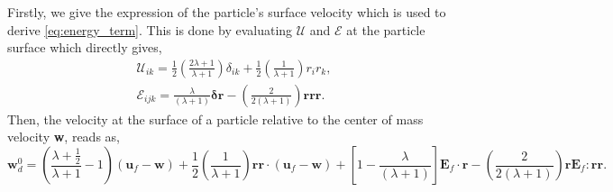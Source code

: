 Firstly, we give the expression of the particle's surface velocity which is used to derive \ref{eq:energy_term}. 
This is done by evaluating $\mathcal{U}$ and $\mathcal{E}$ at the particle surface which directly gives, 
\begin{align}
    \mathcal{U}_{ik} = 
    \frac{1}{2}\left(\frac{2\lambda + 1}{\lambda +1}\right)
    \delta_{ik} 
    + 
    \frac{1}{2}\left(\frac{1}{\lambda +1}\right)
    r_ir_k,  \\
    \mathcal{E}_{ijk}
    = 
    \frac{\lambda}{(\lambda + 1)}
    \bm\delta\textbf{r}
    -\left(\frac{2}{2(\lambda +1 )} \right) \textbf{rrr}. 
\end{align}
Then, the velocity at the surface of a particle relative to the center of mass velocity \textbf{w}, reads as, 
\begin{equation*}
    \textbf{w}_d^0 
    = \left(\frac{\lambda + \frac{1}{2}}{\lambda +1} - 1\right)
    (\textbf{u}_f - \textbf{w}) 
    + 
    \frac{1}{2}\left(\frac{1}{\lambda +1}\right)
    \textbf{rr} \cdot (\textbf{u}_f - \textbf{w})  
    + \left[1-\frac{\lambda}{(\lambda + 1)}\right]\textbf{E}_f\cdot\textbf{r}
    -\left(\frac{2}{2(\lambda +1 )} \right) \textbf{r} \textbf{E}_f:\textbf{rr}. 
\end{equation*}

